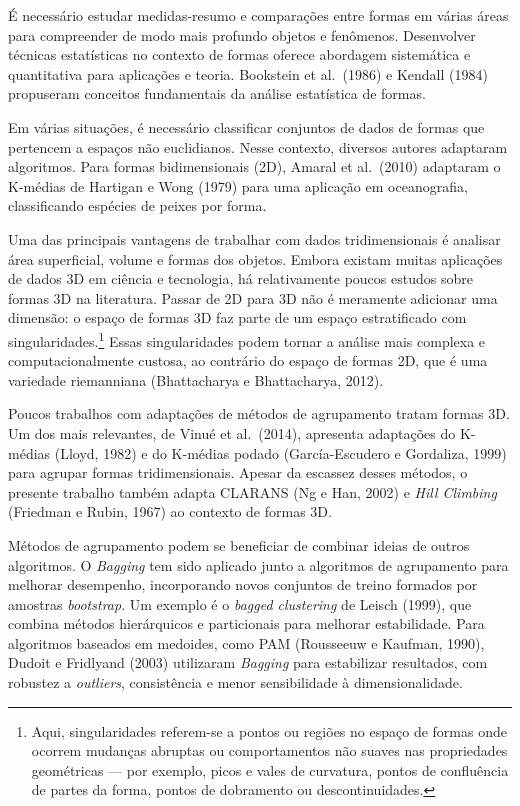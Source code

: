 \documentclass[11pt,a4paper]{article}
\begin{document}
É necessário estudar medidas-resumo e comparações entre formas em várias áreas para compreender de modo mais profundo objetos e fenômenos. Desenvolver técnicas estatísticas no contexto de formas oferece abordagem sistemática e quantitativa para aplicações e teoria. Bookstein et al.\ (1986) e Kendall (1984) propuseram conceitos fundamentais da análise estatística de formas.

Em várias situações, é necessário classificar conjuntos de dados de formas que pertencem a espaços não euclidianos. Nesse contexto, diversos autores adaptaram algoritmos. Para formas bidimensionais (2D), Amaral et al.\ (2010) adaptaram o K-médias de Hartigan e Wong (1979) para uma aplicação em oceanografia, classificando espécies de peixes por forma.

Uma das principais vantagens de trabalhar com dados tridimensionais é analisar área superficial, volume e formas dos objetos. Embora existam muitas aplicações de dados 3D em ciência e tecnologia, há relativamente poucos estudos sobre formas 3D na literatura. Passar de 2D para 3D não é meramente adicionar uma dimensão: o espaço de formas 3D faz parte de um espaço estratificado com singularidades.\footnote{Aqui, singularidades referem-se a pontos ou regiões no espaço de formas onde ocorrem mudanças abruptas ou comportamentos não suaves nas propriedades geométricas --- por exemplo, picos e vales de curvatura, pontos de confluência de partes da forma, pontos de dobramento ou descontinuidades.} Essas singularidades podem tornar a análise mais complexa e computacionalmente custosa, ao contrário do espaço de formas 2D, que é uma variedade riemanniana (Bhattacharya e Bhattacharya, 2012).

Poucos trabalhos com adaptações de métodos de agrupamento tratam formas 3D. Um dos mais relevantes, de Vinué et al.\ (2014), apresenta adaptações do K-médias (Lloyd, 1982) e do K-médias podado (García-Escudero e Gordaliza, 1999) para agrupar formas tridimensionais. Apesar da escassez desses métodos, o presente trabalho também adapta CLARANS (Ng e Han, 2002) e \emph{Hill Climbing} (Friedman e Rubin, 1967) ao contexto de formas 3D.

Métodos de agrupamento podem se beneficiar de combinar ideias de outros algoritmos. O \emph{Bagging} tem sido aplicado junto a algoritmos de agrupamento para melhorar desempenho, incorporando novos conjuntos de treino formados por amostras \emph{bootstrap}. Um exemplo é o \emph{bagged clustering} de Leisch (1999), que combina métodos hierárquicos e particionais para melhorar estabilidade. Para algoritmos baseados em medoides, como PAM (Rousseeuw e Kaufman, 1990), Dudoit e Fridlyand (2003) utilizaram \emph{Bagging} para estabilizar resultados, com robustez a \emph{outliers}, consistência e menor sensibilidade à dimensionalidade.
\end{document}

